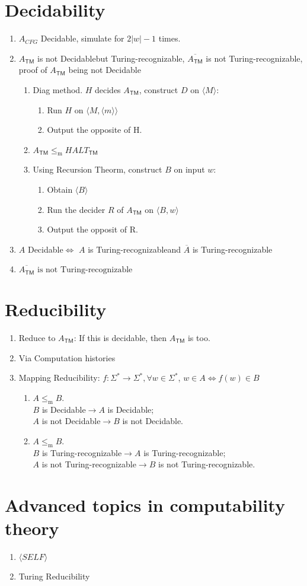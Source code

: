 \documentclass{article}
\newcommand{\TM}{\mathsf{TM}}
\newcommand{\ATM}{A_\TM}
\newcommand{\TR}{Turing-recognizable}
\newcommand{\De}{Decidable}
\newcommand{\U}{\Sigma^*}
\newcommand{\lem}{\leq_\mathrm{m}}
\begin{document}
\section{Decidability}\begin{enumerate}
	\item $A_{CFG}$ \De, simulate for $2|w| - 1$ times.
	\item $\ATM$ is not \De but \TR, $\overline{\ATM}$ is not \TR, proof of $\ATM$ being not \De
	\begin{enumerate}
		\item Diag method. $H$ decides $\ATM$, construct $D$ on $\langle M \rangle$:
		\begin{enumerate}
			\item Run $H$ on $\langle M, \langle m \rangle \rangle$
			\item Output the opposite of H.
		\end{enumerate}
		\item $\ATM \lem HALT_{\TM}$
		\item Using Recursion Theorm, construct $B$ on input $w$:
		\begin{enumerate}
			\item Obtain $\langle B \rangle$
			\item Run the decider $R$ of $\ATM$ on $\langle B, w \rangle$
			\item Output the opposit of R.
		\end{enumerate}
	\end{enumerate}
	\item $A$ \De $\Longleftrightarrow$ $A$ is \TR and $\overline{A}$ is \TR
	\item $\overline{\ATM} \text{ is not \TR}$
\end{enumerate}


\section{Reducibility}\begin{enumerate}
	\item Reduce to $\ATM$: If this is decidable, then $\ATM$ is too.
	\item Via Computation histories
	\item Mapping Reducibility: $f: \U \rightarrow \U, \forall w \in \U$, $w \in A \Longleftrightarrow f(w) \in B$
	\begin{enumerate}
		\item $A \lem B$.  \\
			 $B$ is \De $\rightarrow A$ is \De;  \\
			$A$ is not \De $\rightarrow B$ is not \De.
		\item $A \lem B$.  \\
			 $B$ is \TR $\rightarrow A$ is \TR;  \\
			$A$ is not \TR $\rightarrow B$ is not \TR.
	\end{enumerate}
\end{enumerate}


\section{Advanced topics in computability theory}\begin{enumerate}
	\item $\langle SELF \rangle$
	\item Turing Reducibility
\end{enumerate}
\end{document}

